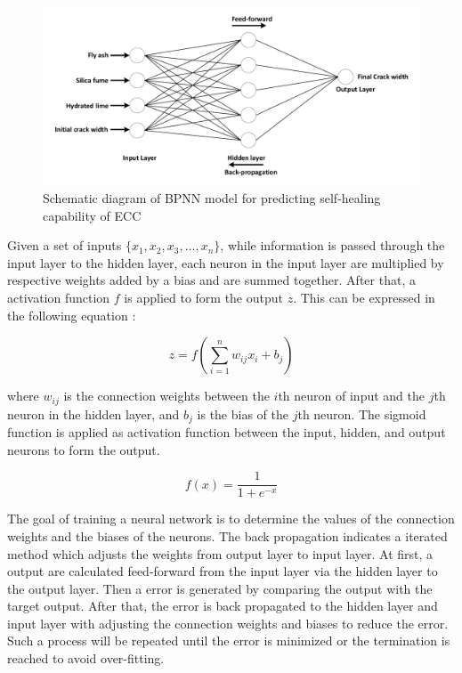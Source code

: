 \documentclass[11pt]{article}
\begin{document}
	\begin{figure}[!]
		\begin{center}
			\includegraphics[width=\textwidth]{BPNN.pdf}
		\end{center}
		\caption{Schematic diagram of BPNN model for predicting self-healing capability of ECC}
		\label{fig:BPNN}
	\end{figure}
	
	Given a set of inputs $ \{ x_1, x_2,x_3,..., x_n\}$, while information is passed through the input layer to the hidden layer, each neuron in the input layer are multiplied by respective weights added by a bias and are summed together. After that, a activation function $f$ is applied to form the output $z$. This can be expressed in the following equation \cite{alshihri2009neural}:
	
	\begin{equation}
	z = f(\sum_{i=1}^{n} w_{ij}x_i + b_j)
	\end{equation}
	
	where $w_{ij}$ is the connection weights between the $i$th neuron of input and the $j$th neuron in the hidden layer, and $b_j$ is the bias of the $j$th neuron. The sigmoid function is applied as activation function between the input, hidden, and output neurons to form the output. 
	
	\begin{equation}
	f(x) = \frac{1}{1+e^{-x}}
	\end{equation}
	
	The goal of training a neural network is to determine the values of the connection weights and the biases of the neurons. The back propagation indicates a iterated method which adjusts the weights from output layer to input layer. At first, a output are calculated feed-forward from the input layer via the hidden layer to the output layer. Then a error is generated by comparing the output with the target output. After that, the error is back propagated to the hidden layer and input layer with adjusting the connection weights and biases to reduce the error. Such a process will be repeated until the error is minimized or the termination is reached to avoid over-fitting. 
	
\end{document}

